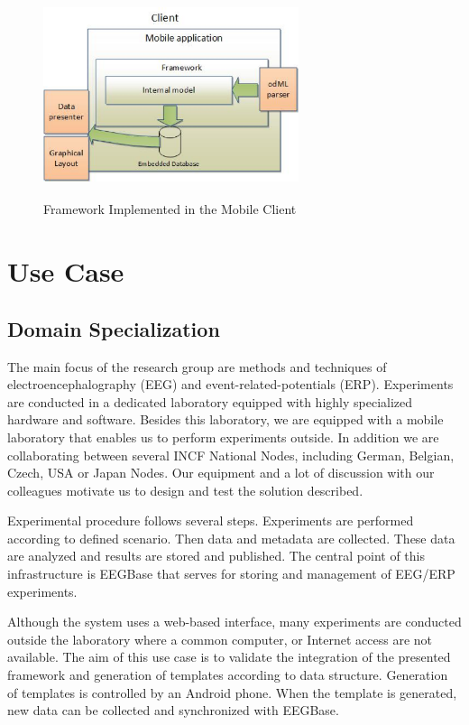 \documentclass[a4paper,twoside]{article}
\begin{document}
\begin{figure}
\centering\includegraphics[width=7.5cm, height=6cm]{Client}
\caption{\label{client}Framework Implemented in the Mobile Client}
\end{figure}


\section{Use Case}

\subsection{Domain Specialization}

The main focus of the research group are methods and techniques of electroencephalography (EEG) and event-related-potentials (ERP). Experiments are conducted in a dedicated laboratory equipped with highly specialized hardware and software. Besides this laboratory, we are equipped with a mobile laboratory that enables us to perform experiments outside. In addition we are collaborating between several INCF National Nodes, including German, Belgian, Czech, USA or Japan Nodes. Our equipment and a lot of discussion with our colleagues motivate us to design and test the solution described.

Experimental procedure follows several steps.  Experiments are performed according to defined scenario. Then data and metadata are collected. These data are analyzed and results are stored and published. The central point of this infrastructure is EEGBase \cite{DBLP:conf/biostec/JezekSBM13} that serves for storing and management of EEG/ERP experiments.

Although the system uses a web-based interface, many experiments are conducted outside the laboratory where a common computer, or Internet access are not available. The aim of this use case is to validate the integration of the presented framework and generation of templates according to data structure. Generation of templates is controlled by an Android phone. When the template is generated, new data can be collected and synchronized with EEGBase.
\end{document}
